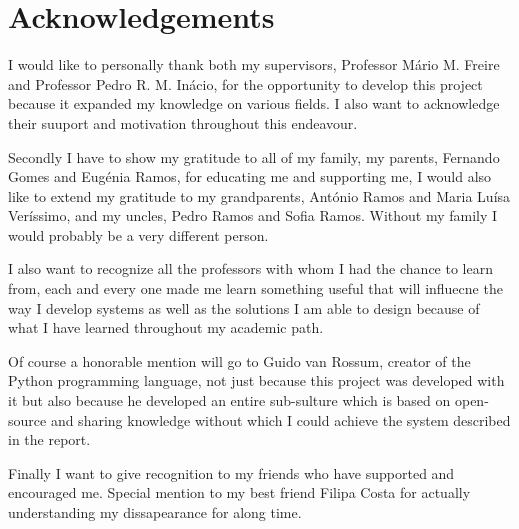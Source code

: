 \chapter*{Acknowledgements}
\label{chap:ack}

I would like to personally thank both my supervisors, Professor Mário M. Freire
and Professor Pedro R. M. Inácio, for the opportunity to develop this project
because it expanded my knowledge on various fields. I also want to acknowledge
their suuport and motivation throughout this endeavour.

Secondly I have to show my gratitude to all of my family, my parents, Fernando
Gomes and Eugénia Ramos, for educating me and supporting me, I would also like
to extend my gratitude to my grandparents, António Ramos and Maria Luísa
Veríssimo, and my uncles, Pedro Ramos and Sofia Ramos. Without my family I
would probably be a very different person.

I also want to recognize all the professors with whom I had the chance to learn
from, each and every one made me learn something useful that will influecne the
way I develop systems as well as the solutions I am able to design because of
what I have learned throughout my academic path.

Of course a honorable mention will go to Guido van Rossum, creator of the Python
programming language, not just because this project was developed with it but
also because he developed an entire sub-sulture which is based on open-source
and sharing knowledge without which I could achieve the system described in the
report.

Finally I want to give recognition to my friends who have supported and
encouraged me. Special mention to my best friend Filipa Costa for actually
understanding my dissapearance for along time.
